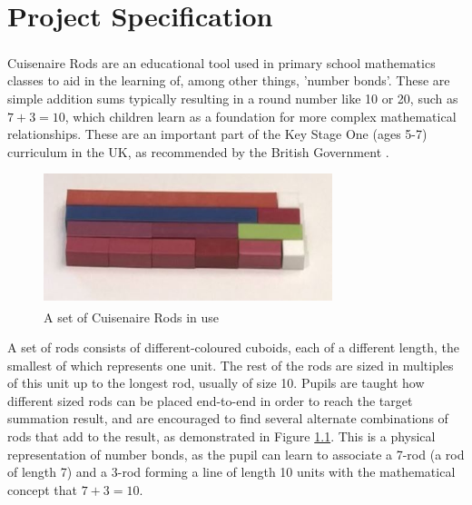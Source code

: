 \chapter{Project Specification}


Cuisenaire\textsuperscript{\textregistered} Rods \cite{TheCuise14:online} are an educational tool used in primary school mathematics classes to aid in the learning of, among other things, 'number bonds'. These are simple addition sums typically resulting in a round number like 10 or 20, such as $7+3=10$, which children learn as a foundation for more complex mathematical relationships. These are an important part of the Key Stage One (ages 5-7) curriculum in the UK, as recommended by the British Government \cite{Mathemat26:online}. 

\begin{figure}[h] 
  \includegraphics[width=0.75\textwidth]{rods.JPG}
  \centering
  \caption{A set of Cuisenaire\textsuperscript{\textregistered} Rods in use \cite{24Lesnom77:online}}
  \label{fig:rods}
\end{figure}

A set of rods consists of different-coloured cuboids, each of a different length, the smallest of which represents one unit. The rest of the rods are sized in multiples of this unit up to the longest rod, usually of size 10. Pupils are taught how different sized rods can be placed end-to-end in order to reach the target summation result, and are encouraged to find several alternate combinations of rods that add to the result, as demonstrated in Figure \ref{fig:rods}. This is a physical representation of number bonds, as the pupil can learn to associate a 7-rod (a rod of length 7) and a 3-rod forming a line of length 10 units with the mathematical concept that $7+3=10$. \\

